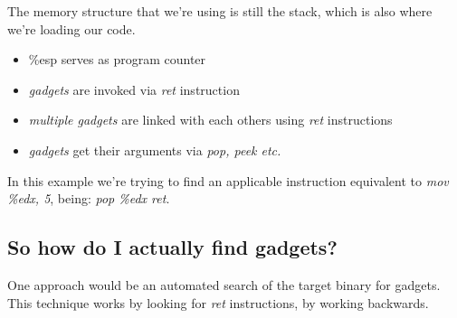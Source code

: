 \documentclass[11pt, oneside]{article}   	%
\begin{document}
The memory structure that we're using is still the stack, which is also where we're loading our code.\begin{itemize}
\item \%esp serves as program counter
\item \emph{gadgets} are invoked via \emph{ret} instruction
\item \emph{multiple gadgets} are linked with each others using \emph{ret} instructions
\item \emph{gadgets} get their arguments via \emph{pop, peek etc.}
\end{itemize}
In this example we're trying to find an applicable instruction equivalent to \emph{mov \%edx, 5}, being: \emph{pop \%edx ret}.

\subsection*{So how do I actually find gadgets?}
One approach would be an automated search of the target binary for gadgets. This technique works by looking for \emph{ret} instructions, by working backwards.
\end{document}
